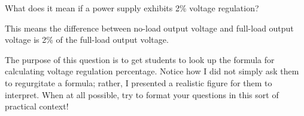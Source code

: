 

What does it mean if a power supply exhibits 2\% voltage regulation?







This means the difference between no-load output voltage and full-load output voltage is 2\% of the full-load output voltage.







The purpose of this question is to get students to look up the formula for calculating voltage regulation percentage.  Notice how I did not simply ask them to regurgitate a formula; rather, I presented a realistic figure for them to interpret.  When at all possible, try to format your questions in this sort of practical context!




